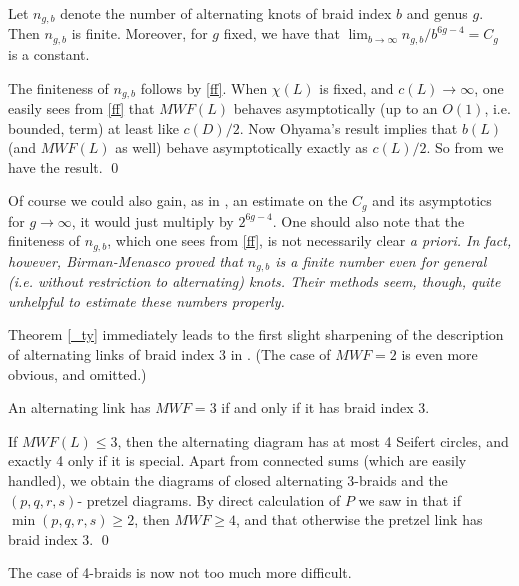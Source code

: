 \begin{corr}
Let $n_{g,b}$ denote the number of alternating knots of
braid index $b$ and genus $g$. Then $n_{g,b}$ is finite.
Moreover, for $g$ fixed, we have that
$\lim_{b\to \infty} n_{g,b}/b^{6g-4}=C_g$ is a constant.
\end{corr}

\proof The finiteness of $n_{g,b}$ follows by \eqref{ff}.
When $\chi(L)$ is fixed, and $c(L)\to\infty$, one easily
sees from \eqref{ff} that $MWF(L)$ behaves asymptotically
(up to an $O(1)$, i.e. bounded, term)
at least like $c(D)/2$. Now Ohyama's result \cite{Ohyama}
implies that $b(L)$ (and $MWF(L)$ as well) behave asymptotically
exactly as $c(L)/2$. So from \cite{SV} we have the result.
\qed

\begin{rem}\label{rfn}
Of course we could also gain, as in \cite{SV}, an estimate on the
$C_g$ and its asymptotics for $g\to \infty$, it would just multiply
by $2^{6g-4}$. One should also note that the finiteness of
$n_{g,b}$, which one sees from \eqref{ff}, is not necessarily
clear \em{a priori}. In fact, however, Birman-Menasco proved
\cite{BirMen3} that $n_{g,b}$ is a finite number even for \em{general}
(i.e. without restriction to alternating) knots. Their methods seem,
though, quite unhelpful to estimate these numbers properly.
\end{rem}

Theorem \ref{_ty} immediately leads to the first slight sharpening
of the description of alternating links of braid index 3 in
\cite{3br}. (The case of $MWF=2$ is even more obvious, and omitted.)

\begin{corr}\label{opi}
An alternating link has $MWF=3$ if and only if it has braid index 3.
\end{corr}

\proof If $MWF(L)\le 3$, then the alternating diagram has at
most 4 Seifert circles, and exactly 4 only if it is special.
Apart from connected sums (which are easily handled), we obtain
the diagrams of closed alternating 3-braids and the $(p,q,r,s)$-
pretzel diagrams. By direct calculation of $P$ we saw in
\cite{3br} that if $\min(p,q,r,s)\ge 2$, then $MWF\ge 4$,
and that otherwise the pretzel link has braid index 3. \qed

The case of 4-braids is now not too much more difficult.

